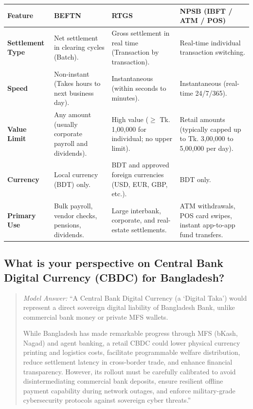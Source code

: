 \begin{table}[htbp]
\centering
\small
\renewcommand{\arraystretch}{1.3}
\begin{tabularx}{\textwidth}{|l|X|X|X|}
\hline
\textbf{Feature} & \textbf{BEFTN} & \textbf{RTGS} & \textbf{NPSB (IBFT / ATM / POS)} \\
\hline
\textbf{Settlement Type} & Net settlement in clearing cycles (Batch). & Gross settlement in real time (Transaction by transaction). & Real-time individual transaction switching. \\
\hline
\textbf{Speed} & Non-instant (Takes hours to next business day). & Instantaneous (within seconds to minutes). & Instantaneous (real-time 24/7/365). \\
\hline
\textbf{Value Limit} & Any amount (usually corporate payroll and dividends). & High value ($\ge$ Tk. 1,00,000 for individual; no upper limit). & Retail amounts (typically capped up to Tk. 3,00,000 to 5,00,000 per day). \\
\hline
\textbf{Currency} & Local currency (BDT) only. & BDT and approved foreign currencies (USD, EUR, GBP, etc.). & BDT only. \\
\hline
\textbf{Primary Use} & Bulk payroll, vendor checks, pensions, dividends. & Large interbank, corporate, and real-estate settlements. & ATM withdrawals, POS card swipes, instant app-to-app fund transfers. \\
\hline
\end{tabularx}
\end{table}

\medskip

\subsection{What is your perspective on Central Bank Digital Currency (CBDC) for Bangladesh?}

\begin{quote}
\textit{Model Answer:}
``A Central Bank Digital Currency (a `Digital Taka') would represent a direct sovereign digital liability of Bangladesh Bank, unlike commercial bank money or private MFS wallets. 

While Bangladesh has made remarkable progress through MFS (bKash, Nagad) and agent banking, a retail CBDC could lower physical currency printing and logistics costs, facilitate programmable welfare distribution, reduce settlement latency in cross-border trade, and enhance financial transparency. However, its rollout must be carefully calibrated to avoid disintermediating commercial bank deposits, ensure resilient offline payment capability during network outages, and enforce military-grade cybersecurity protocols against sovereign cyber threats.''
\end{quote}

